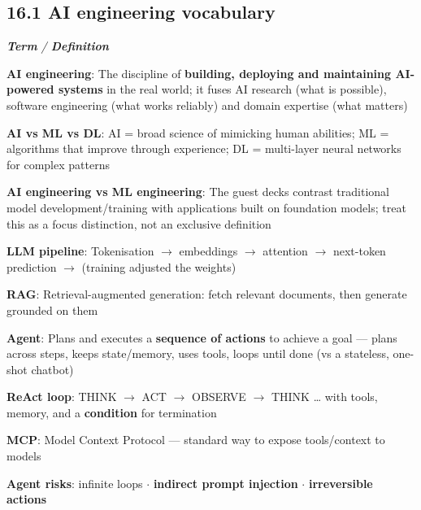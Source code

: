 \begin{studycolumns}
\vspace{0pt}



\subsection*{16.1 AI engineering vocabulary}

\begin{referenceentries}
\textit{\textbf{Term} / \textbf{Definition}}\par\smallskip
\noindent \textbf{\textbf{AI engineering}}: The discipline of \textbf{building, deploying and maintaining AI-powered systems} in the real world; it fuses AI research (what is possible), software engineering (what works reliably) and domain expertise (what matters)\par
\noindent \textbf{\textbf{AI vs ML vs DL}}: AI = broad science of mimicking human abilities; ML = algorithms that improve through experience; DL = multi-layer neural networks for complex patterns\par
\noindent \textbf{\textbf{AI engineering vs ML engineering}}: The guest decks contrast traditional model development/\allowbreak{}training with applications built on foundation models; treat this as a focus distinction, not an exclusive definition\par
\noindent \textbf{\textbf{LLM pipeline}}: Tokenisation \ensuremath{\rightarrow} embeddings \ensuremath{\rightarrow} attention \ensuremath{\rightarrow} next-token prediction \ensuremath{\rightarrow} (training adjusted the weights)\par
\noindent \textbf{\textbf{RAG}}: Retrieval-augmented generation: fetch relevant documents, then generate grounded on them\par
\noindent \textbf{\textbf{Agent}}: Plans and executes a \textbf{sequence of actions} to achieve a goal --- plans across steps, keeps state/\allowbreak{}memory, uses tools, loops until done (vs a stateless, one-shot chatbot)\par
\noindent \textbf{\textbf{ReAct loop}}: THINK \ensuremath{\rightarrow} ACT \ensuremath{\rightarrow} OBSERVE \ensuremath{\rightarrow} THINK \ldots{} with tools, memory, and a \textbf{condition} for termination\par
\noindent \textbf{\textbf{MCP}}: Model Context Protocol --- standard way to expose tools/\allowbreak{}context to models\par
\noindent \textbf{\textbf{Agent risks}}: infinite loops \ensuremath{\cdot} \textbf{indirect prompt injection} \ensuremath{\cdot} \textbf{irreversible actions}\par
\end{referenceentries}

\end{studycolumns}

